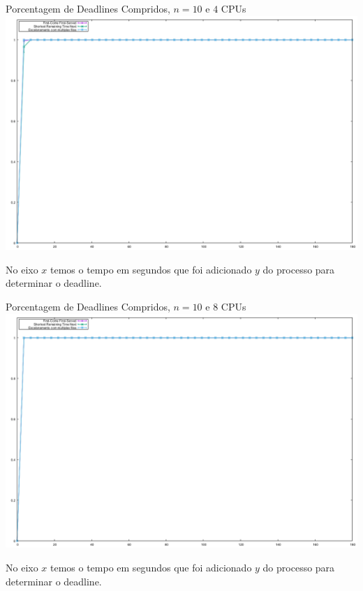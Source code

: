 \documentclass{beamer}
\begin{document}
\begin{frame}{Porcentagem de Deadlines Compridos, $n = 10$ e $4$ CPUs}
	\includegraphics[width=\textwidth]{graphs/testes_capella/result/deadlines-r4-10}
	
	{\tiny No eixo $x$ temos o tempo em segundos que foi adicionado $y$ do processo para determinar o deadline.}
\end{frame}


\begin{frame}{Porcentagem de Deadlines Compridos, $n = 10$ e $8$ CPUs}
	\includegraphics[width=\textwidth]{graphs/testes_capella/result/deadlines-r8-10}
	
	{\tiny No eixo $x$ temos o tempo em segundos que foi adicionado $y$ do processo para determinar o deadline.}
\end{frame}
\end{document}
